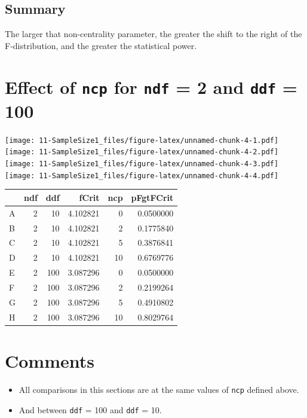 \documentclass[]{book}
\providecommand{\tightlist}{%
  \setlength{\itemsep}{0pt}\setlength{\parskip}{0pt}}
\begin{document}
\hypertarget{summary-3}{%
\subsection{Summary}\label{summary-3}}

The larger that non-centrality parameter, the greater the shift to the right of the F-distribution, and the greater the statistical power.

\hypertarget{effect-of-ncp-for-ndf-2-and-ddf-100}{%
\section{\texorpdfstring{Effect of \texttt{ncp} for \texttt{ndf} = 2 and \texttt{ddf} = 100}{Effect of ncp for ndf = 2 and ddf = 100}}\label{effect-of-ncp-for-ndf-2-and-ddf-100}}

\texttt{[image: 11-SampleSize1\_files/figure-latex/unnamed-chunk-4-1.pdf]} \texttt{[image: 11-SampleSize1\_files/figure-latex/unnamed-chunk-4-2.pdf]} \texttt{[image: 11-SampleSize1\_files/figure-latex/unnamed-chunk-4-3.pdf]} \texttt{[image: 11-SampleSize1\_files/figure-latex/unnamed-chunk-4-4.pdf]}

\begin{tabular}{l|r|r|r|r|r}
\hline
  & ndf & ddf & fCrit & ncp & pFgtFCrit\\
\hline
A & 2 & 10 & 4.102821 & 0 & 0.0500000\\
\hline
B & 2 & 10 & 4.102821 & 2 & 0.1775840\\
\hline
C & 2 & 10 & 4.102821 & 5 & 0.3876841\\
\hline
D & 2 & 10 & 4.102821 & 10 & 0.6769776\\
\hline
E & 2 & 100 & 3.087296 & 0 & 0.0500000\\
\hline
F & 2 & 100 & 3.087296 & 2 & 0.2199264\\
\hline
G & 2 & 100 & 3.087296 & 5 & 0.4910802\\
\hline
H & 2 & 100 & 3.087296 & 10 & 0.8029764\\
\hline
\end{tabular}

\hypertarget{comments-1}{%
\section{Comments}\label{comments-1}}

\begin{itemize}
\tightlist
\item
  All comparisons in this sections are at the same values of \texttt{ncp} defined above.
\item
  And between \texttt{ddf} = 100 and \texttt{ddf} = 10.
\end{itemize}
\end{document}
